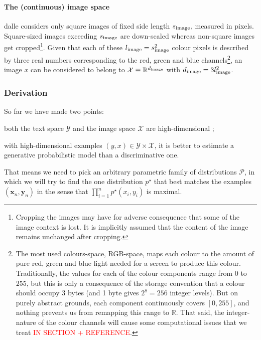 \documentclass{article}
\begin{document}
\begin{multicols}{2}
\paragraph{The (continuous) image space}

\gls{dalle} considers only square images of fixed side length $s_{\mathrm{image}}$, measured in pixels.
Square-sized images exceeding $s_{\mathrm{image}}$ are down-scaled whereas non-square images get cropped\footnote{
Cropping the images may have for adverse consequence that some of the image context is lost. It is implicitly assumed that the content of the image remains unchanged after cropping.
}.
Given that each of these $l_{\mathrm{image}}=s_{\mathrm{image}}^2$ colour pixels is described by three real numbers corresponding to the red, green and blue channels\footnote{
The most used colours-space, RGB-space, maps each colour to the amount of pure red, green and blue light needed for a screen to produce this colour. Traditionally, the values for each of the colour components range from 0 to $255$, but this is only a consequence of the storage convention that a colour should occupy 3 bytes (and 1 byte gives $2^8=256$ integer levels). But on purely abstract grounds, each component continuously covers $[0,255]$, and nothing prevents us from remapping this range to $\mathbb{R}$.
That said, the integer-nature of the colour channels will cause some computational issues that we treat \textcolor{red}{IN SECTION + REFERENCE}.
}, an image $x$ can be considered to belong to $\mathcal{X}\equiv \mathbb{R}^{d_{\mathrm{image}}}$ with $d_{\mathrm{image}}=3l_{\mathrm{image}}^2$.

\subsubsection{Derivation}

So far we have made two points: \begin{enumerate*}[label=(\roman*)]
\item both the text space $\mathcal{Y}$ and the image space $\mathcal{X}$ are high-dimensional ;
\item with high-dimensional examples $(y,x)\in\mathcal{Y}\times\mathcal{X}$, it is better to estimate a generative probabilistic model than a discriminative one.
\end{enumerate*}
That means we need to pick an arbitrary parametric family of distributions $\mathcal{P}$, in which we will try to find the one distribution $p^\star$ that best matches the examples $(\mathbf{x}_n,\mathbf{y}_n)$ in the sense that $\prod_{i=1}^{n} p^\star(x_i,y_i)$ is maximal.


\end{multicols}
\end{document}
